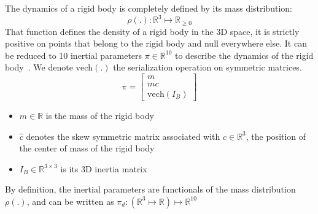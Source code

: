 The dynamics of a rigid body is completely defined by its mass distribution:
\begin{equation}
  \rho(.):\mathbb{R}^3 \mapsto\mathbb{R}_{\geq 0}
\end{equation}
That function defines the density of a rigid body in the 3D space, it is strictly positive on points that belong to the rigid body and null everywhere else.
It can be reduced to 10 inertial parameters $\pi\in\mathbb{R}^{10}$ to describe the dynamics of the rigid body~\cite{hollerbach2008}.
We denote $\text{vech}(.)$ the serialization operation on symmetric matrices.
\begin{equation}
  \pi = \begin{bmatrix}
    m \\
    mc \\
    \text{vech}(I_B)
  \end{bmatrix}
\end{equation}
\begin{itemize}
  \item $m\in\mathbb{R}$ is the mass of the rigid body
  \item $\hat{c}$ denotes the skew symmetric matrix associated with $c\in\mathbb{R}^3$, the position of the center of mass of the rigid body
  \item $I_B\in\mathbb{R}^{3\times 3}$ is its 3D inertia matrix
\end{itemize}


By definition, the inertial parameters are functionals of the mass distribution $\rho(.)$, and can be written as $\pi_d:(\mathbb{R}^3\mapsto\mathbb{R})\mapsto\mathbb{R}^{10}$


